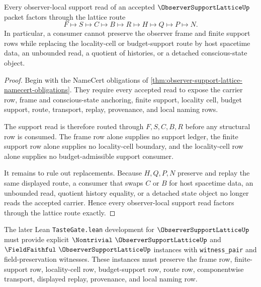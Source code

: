 \begin{theorem}
\label{thm:observer-support-lattice-route-exactness}
Every observer-local support read of an accepted $\ObserverSupportLatticeUp$ packet factors through the lattice route
$$
F \longmapsto S \longmapsto C \longmapsto B \longmapsto R \longmapsto H \longmapsto Q \longmapsto P \longmapsto N.
$$
In particular, a consumer cannot preserve the observer frame and finite support rows while replacing the locality-cell or budget-support route by host spacetime data, an unbounded read, a quotient of histories, or a detached conscious-state object.
\end{theorem}
\begin{proof}
Begin with the NameCert obligations of \autoref{thm:observer-support-lattice-namecert-obligations}. They require every accepted read to expose the carrier row, frame and conscious-state anchoring, finite support, locality cell, budget support, route, transport, replay, provenance, and local naming rows.

The support read is therefore routed through $F,S,C,B,R$ before any structural row is consumed. The frame row alone supplies no support ledger, the finite support row alone supplies no locality-cell boundary, and the locality-cell row alone supplies no budget-admissible support consumer.

It remains to rule out replacements. Because $H,Q,P,N$ preserve and replay the same displayed route, a consumer that swaps $C$ or $B$ for host spacetime data, an unbounded read, quotient history equality, or a detached state object no longer reads the accepted carrier. Hence every observer-local support read factors through the lattice route exactly.
\end{proof}

The later Lean \texttt{TasteGate.lean} development for $\ObserverSupportLatticeUp$ must provide explicit $\Nontrivial\ \ObserverSupportLatticeUp$ and $\FieldFaithful\ \ObserverSupportLatticeUp$ instances with \texttt{witness\_pair} and field-preservation witnesses. These instances must preserve the frame row, finite-support row, locality-cell row, budget-support row, route row, componentwise transport, displayed replay, provenance, and local naming row.



